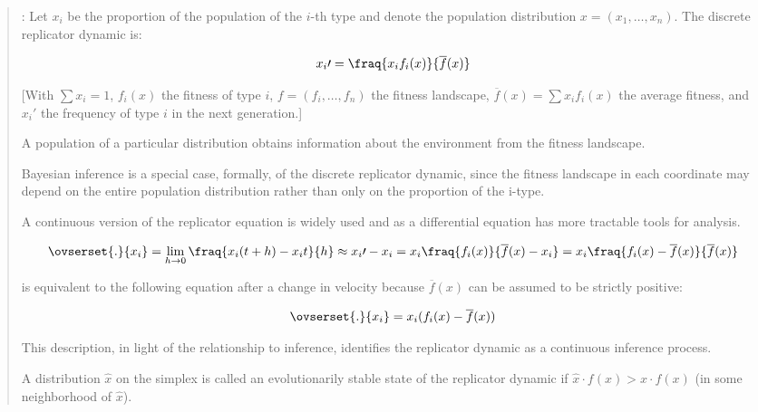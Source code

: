 \documentclass[a4paper,10pt]{article}
\begin{document}
\begin{quotation} \cite{harper2009-replicatorAsInference}:
    Let $x_i$ be the proportion of the population of the $i$-th type and denote the population distribution $x = (x_1 , \dots , x_n)$.
    The discrete replicator dynamic is:
    
    \begin{equation}
    x_i\prime = \fraq{x_i f_i(x)}{\overline{f}(x)}
    \end{equation}
    
    [With $\sum x_i = 1$, $f_i(x)$ the fitness of type $i$, $f=(f_i, \dots, f_n)$ the fitness landscape, $\overline{f}(x)=\sum x_i f_i(x)$ the average fitness, and $x_i\prime$ the frequency of type $i$ in the next generation.]
    
    A population of a particular distribution obtains information about the environment from the fitness landscape.

    Bayesian inference is a special case, formally, of the discrete replicator dynamic, since the fitness landscape in each coordinate may depend on the entire population distribution rather than only on the proportion of the i-type.
    
    A continuous version of the replicator equation is widely used and as a differential equation has more tractable tools for analysis.
    
    \begin{equation}
     \ovserset{.}{x_i} = \lim_{h \rightarrow 0} \fraq{x_i(t+h) - x_i{t}}{h} \approx x_i\prime - x_i = x_i \fraq{f_i(x)}{\overline{f}(x) - x_i} = x_i \fraq{f_i(x) - \overline{f}(x)}{\overline{f}(x)}
    \end{equation}
    
    is equivalent to the following equation after a change in velocity because $\overline{f}(x)$ can be assumed to be strictly positive:
    
    \begin{equation}
    \ovserset{.}{x_i} = x_i (f_i(x) - \overline{f}(x))
    \end{equation}
    
    This description, in light of the relationship to inference, identifies the replicator dynamic as a continuous inference process.
    
    A distribution $\hat{x}$ on the simplex is called an evolutionarily stable state of the replicator dynamic if $\hat{x} \cdot f(x) > x \cdot f(x)$ (in some neighborhood of $\hat{x}$).
    

\end{quotation}
\end{document}
